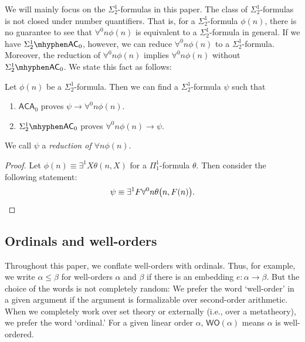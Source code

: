 \documentclass{mhkr}
\newcommand{\WO}{\mathsf{WO}}
\newcommand{\AC}{\mathsf{AC}}
\newcommand{\ACA}{\mathsf{ACA}}
\begin{document}
We will mainly focus on the $\Sigma^1_2$-formulas in this paper.
The class of $\Sigma^1_2$-formulas is not closed under number quantifiers. That is, for a $\Sigma^1_2$-formula $\phi(n)$, there is no guarantee to see that $\forall^0 n \phi(n)$ is equivalent to a $\Sigma^1_2$-formula in general. If we have $\Sigma^1_2\mhyphen\AC_0$, however, we can reduce $\forall^0 n \phi(n)$ to a $\Sigma^1_2$-formula. Moreover, the reduction of $\forall^0 n\phi(n)$ implies $\forall^0 n \phi(n)$ without $\Sigma^1_2\mhyphen\AC_0$. We state this fact as follows: 
\begin{lemma} \label{Lemma: Reducing forall n Sigma 1 2}
    Let $\phi(n)$ be a $\Sigma^1_2$-formula. Then we can find a $\Sigma^1_2$-formula $\psi$ such that
    \begin{enumerate}
        \item $\ACA_0$ proves $\psi\to\forall^0 n \phi(n)$.
        \item $\Sigma^1_2\mhyphen\AC_0$ proves $\forall^0 n \phi(n) \to \psi$.
    \end{enumerate}
    We call $\psi$ a \emph{reduction of $\forall n \phi(n)$}.
\end{lemma}
\begin{proof}
    Let $\phi(n)\equiv \exists^1 X \theta(n,X)$ for a $\Pi^1_1$-formula $\theta$. Then consider the following statement:
    \begin{equation*}
        \psi \equiv \exists^1 F \forall^0 n \theta\bigl(n,F(n)\bigr). \qedhere 
    \end{equation*}
\end{proof}

\subsection{Ordinals and well-orders}
Throughout this paper, we conflate well-orders with ordinals. Thus, for example, we write $\alpha\le \beta$ for well-orders $\alpha$ and $\beta$ if there is an embedding $e\colon \alpha\to\beta$. But the choice of the words is not completely random: We prefer the word `well-order' in a given argument if the argument is formalizable over second-order arithmetic. When we completely work over set theory or externally (i.e., over a metatheory), we prefer the word `ordinal.' For a given linear order $\alpha$, $\WO(\alpha)$ means $\alpha$ is well-ordered.
\end{document}
